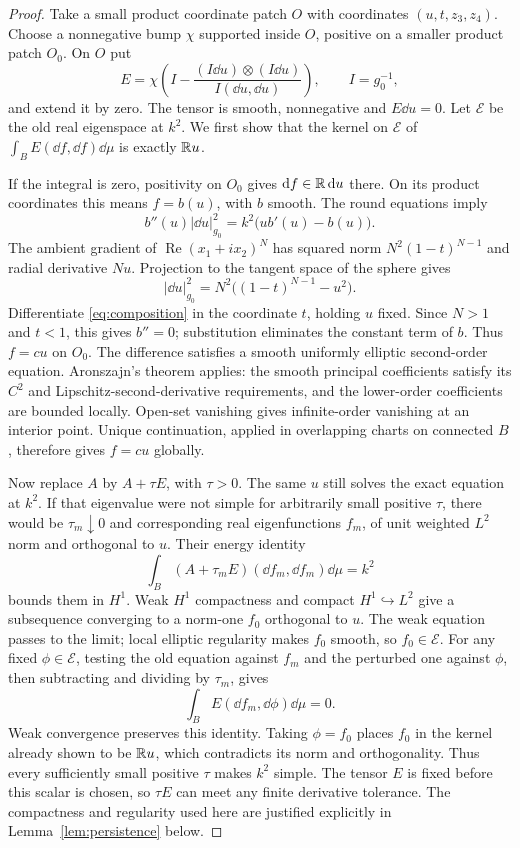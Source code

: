 \begin{proof}
Take a small product coordinate patch \(O\) with coordinates
\((u,t,z_3,z_4)\). Choose a nonnegative bump \(\chi\) supported
inside \(O\), positive on a smaller product patch \(O_0\). On \(O\) put
\[
 E=\chi\left(I-
   \frac{(I\dd u)\otimes(I\dd u)}{I(\dd u,\dd u)}\right),
 \qquad I=g_0^{-1},
\]
and extend it by zero. The tensor is smooth, nonnegative and
\(E\dd u=0\). Let \(\mathcal E\) be the old real eigenspace at
\(k^2\). We first show that the kernel on \(\mathcal E\) of
\(\int_B E(\dd f,\dd f)\dd\mu\) is exactly \(\mathbb R u\).

If the integral is zero, positivity on \(O_0\) gives
\(\mathrm d f\in\mathbb R\,\mathrm d u\) there. On its product coordinates this
means \(f=b(u)\), with \(b\) smooth. The round equations imply
\begin{equation}\label{eq:composition}
 b''(u)|\dd u|_{g_0}^2=k^2\bigl(ub'(u)-b(u)\bigr).
\end{equation}
The ambient gradient of \(\operatorname{Re}(x_1+i x_2)^N\)
has squared norm \(N^2(1-t)^{N-1}\) and radial derivative \(Nu\).
Projection to the tangent space of the sphere gives
\[
 |\dd u|_{g_0}^2=N^2\bigl((1-t)^{N-1}-u^2\bigr).
\]
Differentiate \eqref{eq:composition} in the coordinate \(t\),
holding \(u\) fixed. Since \(N>1\) and \(t<1\), this gives
\(b''=0\); substitution eliminates the constant term of \(b\).
Thus \(f=cu\) on \(O_0\).
The difference satisfies a smooth uniformly elliptic second-order
equation. Aronszajn's theorem \cite[pp.~235--236]{Aronszajn}
applies: the smooth principal coefficients satisfy its
\(C^2\) and Lipschitz-second-derivative requirements, and the
lower-order coefficients are bounded locally. Open-set vanishing
gives infinite-order vanishing at an interior point. Unique
continuation, applied in overlapping charts on connected \(B\),
therefore gives \(f=cu\) globally.

Now replace \(A\) by \(A+\tau E\), with \(\tau>0\).
The same \(u\) still solves the exact equation at \(k^2\).
If that eigenvalue were not simple for arbitrarily small positive
\(\tau\), there would be \(\tau_m\downarrow0\) and corresponding
real eigenfunctions \(f_m\), of unit weighted \(L^2\) norm and
orthogonal to \(u\). Their energy identity
\[
 \int_B(A+\tau_mE)(\dd f_m,\dd f_m)\dd\mu=k^2
\]
bounds them in \(H^1\). Weak \(H^1\) compactness and compact
\(H^1\hookrightarrow L^2\) give a subsequence converging to
a norm-one \(f_0\) orthogonal to \(u\).
The weak equation passes to the limit; local elliptic regularity
makes \(f_0\) smooth, so \(f_0\in\mathcal E\).
For any fixed \(\phi\in\mathcal E\), testing the old equation
against \(f_m\) and the perturbed one against \(\phi\), then
subtracting and dividing by \(\tau_m\), gives
\[
 \int_B E(\dd f_m,\dd\phi)\dd\mu=0.
\]
Weak convergence preserves this identity. Taking \(\phi=f_0\)
places \(f_0\) in the kernel already shown to be \(\mathbb R u\),
which contradicts its norm and orthogonality.
Thus every sufficiently small positive \(\tau\) makes \(k^2\)
simple. The tensor \(E\) is fixed before this scalar is chosen,
so \(\tau E\) can meet any finite derivative tolerance.
The compactness and regularity used here are justified explicitly
in Lemma~\ref{lem:persistence} below.
\end{proof}

